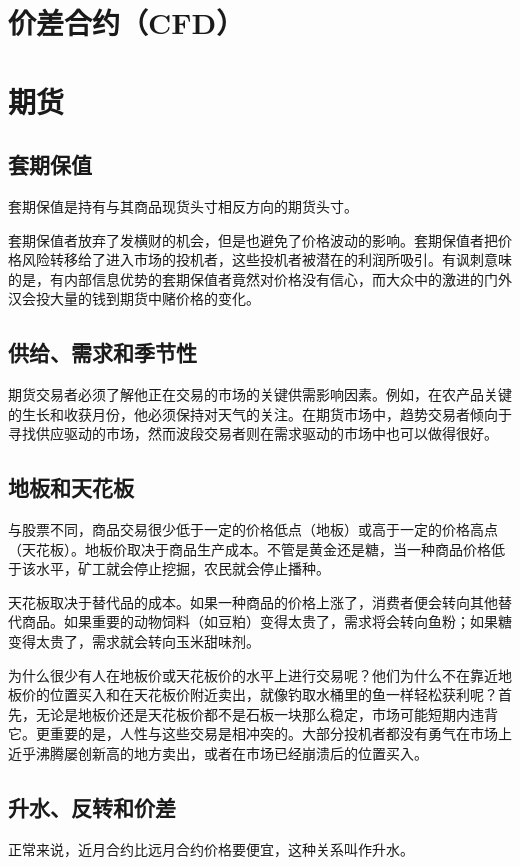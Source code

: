 \section{价差合约（CFD）}
\section{期货}
\subsection*{套期保值}
套期保值是持有与其商品现货头寸相反方向的期货头寸。

套期保值者放弃了发横财的机会，但是也避免了价格波动的影响。套期保值者把价格风险转移给了进入市场的投机者，这些投机者被潜在的利润所吸引。有讽刺意味的是，有内部信息优势的套期保值者竟然对价格没有信心，而大众中的激进的门外汉会投大量的钱到期货中赌价格的变化。

\subsection*{供给、需求和季节性}
期货交易者必须了解他正在交易的市场的关键供需影响因素。例如，在农产品关键的生长和收获月份，他必须保持对天气的关注。在期货市场中，趋势交易者倾向于寻找供应驱动的市场，然而波段交易者则在需求驱动的市场中也可以做得很好。
\subsection*{地板和天花板}
与股票不同，商品交易很少低于一定的价格低点（地板）或高于一定的价格高点（天花板）。地板价取决于商品生产成本。不管是黄金还是糖，当一种商品价格低于该水平，矿工就会停止挖掘，农民就会停止播种。

天花板取决于替代品的成本。如果一种商品的价格上涨了，消费者便会转向其他替代商品。如果重要的动物饲料（如豆粕）变得太贵了，需求将会转向鱼粉；如果糖变得太贵了，需求就会转向玉米甜味剂。

为什么很少有人在地板价或天花板价的水平上进行交易呢？他们为什么不在靠近地板价的位置买入和在天花板价附近卖出，就像钓取水桶里的鱼一样轻松获利呢？首先，无论是地板价还是天花板价都不是石板一块那么稳定，市场可能短期内违背它。更重要的是，人性与这些交易是相冲突的。大部分投机者都没有勇气在市场上近乎沸腾屡创新高的地方卖出，或者在市场已经崩溃后的位置买入。
\subsection*{升水、反转和价差}
正常来说，近月合约比远月合约价格要便宜，这种关系叫作升水。

